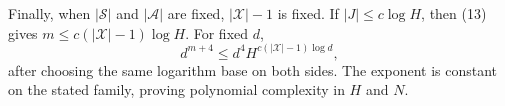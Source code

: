 Finally, when \(|\mathcal S|\) and \(|\mathcal A|\) are fixed, \(|\mathcal X|-1\) is fixed.  If \(|J|\le c\log H\), then (13) gives \(m\le c(|\mathcal X|-1)\log H\).  For fixed \(d\),
\[
 d^{m+4}\le d^4 H^{c(|\mathcal X|-1)\log d},
\]
after choosing the same logarithm base on both sides.  The exponent is constant on the stated family, proving polynomial complexity in \(H\) and \(N\).